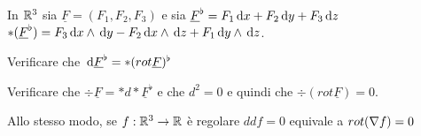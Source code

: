 \begin{exercise}
	In $\mathbb R^3$ sia $\underline F=(F_1,F_2,F_3)$ e sia $\underline F^\flat = F_1 \,\mathrm d x + F_2 \,\mathrm d y + F_3 \,\mathrm d z$
	$*(\underline F^\flat) = F_3\,\mathrm d x \wedge \,\mathrm d y - F_2 \,\mathrm d x \wedge \,\mathrm d z + F_1 \,\mathrm d y \wedge \,\mathrm d z$.
	
	Verificare che $\,\mathrm d \underline{F}^\flat = *(rot \underline{F})^\flat$
	
	Verificare che $\div \underline F = *d * \underline F^\flat$ e che $d^2 = 0$ e quindi che $\div (rot \underline F)=0$.
	
	Allo stesso modo, se $f:\mathbb R^3\to\mathbb R$ è regolare $ddf=0$ equivale a $rot(\nabla f)=0$
\end{exercise}
























































































